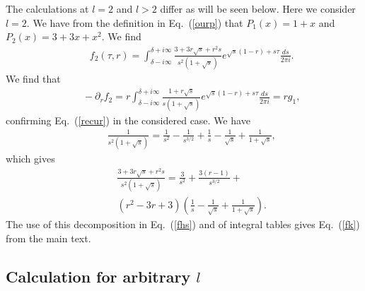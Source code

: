 \documentclass[aps,prx,twocolumn,amsmath,amssymb,amsfonts]{revtex4-2}
\begin{document}
{{\begin{appendices}
The calculations at $l=2$ and $l>2$ differ as will be seen below. Here we consider $l=2$. We have from the definition in Eq.~(\ref{ourp}) that $P_1(x)=1+x$ and $P_2(x)=3+3x+x^2$. We find
\begin{eqnarray}&&\!\!\!\!\!\!\!
f_2(\tau, r)\!=\! \int_{\delta-i\infty}^{\delta+i\infty}\frac{3+3r \sqrt{s}+r^2s}{s^{2} (1+\sqrt{s})}e^{\sqrt{s}(1-r)+s\tau}\frac{ds}{2\pi i}. \label{fhs}
\end{eqnarray}
We find that
\begin{eqnarray}&&\!\!\!\!\!\!\!\!\!
-\partial_r f_2\!=\!r\!\int_{\delta-i\infty}^{\delta+i\infty}\!\!\frac{1 +r\sqrt{s}}{s(1+\sqrt{s})}e^{\sqrt{s}(1-r)+s\tau}\frac{ds}{2\pi i}=rg_1,
\end{eqnarray}
confirming Eq.~(\ref{recur}) in the considered case. We have
\begin{eqnarray}&&\!\!\!\!\!\!\!
\frac{1}{s^{2} (1+\sqrt{s})}=%
\frac{1}{s^2}-\frac{1}{s^{3/2}}+\frac{1}{s}-\frac{1}{\sqrt{s}}+\frac{1}{1+\sqrt{s}},
\end{eqnarray}
which gives
\begin{eqnarray}&&\!\!\!\!\!\!\!
\frac{3+3r \sqrt{s}+r^2s}{s^{2} (1+\sqrt{s})}%
=\frac{3}{s^2}+\frac{3(r-1)}{s^{3/2}}+ \nonumber \\
&&\!\!\!\!\!\!\!
(r^2-3r+3)\left(\frac{1}{s}-\frac{1}{\sqrt{s}}+\frac{1}{1+\sqrt{s}}\right). \label{lar}
\end{eqnarray}
The use of this decomposition in Eq.~(\ref{fhs}) and of integral tables \cite{prud} gives Eq.~(\ref{fk}) from the main text.


\subsection{Calculation for arbitrary $l$}


\end{appendices}}}
\end{document}
